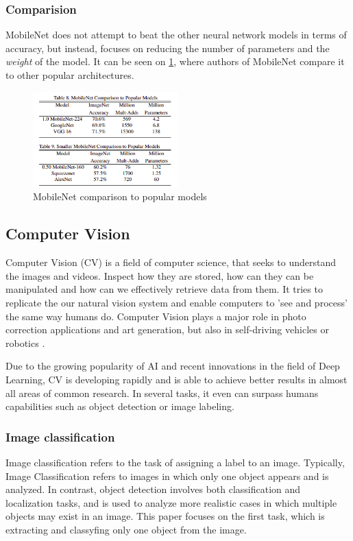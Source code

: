 \documentclass[../Main.tex]{subfiles}
\begin{document}
    \subsubsection{Comparision}
        MobileNet does not attempt to beat the other neural network models in terms of accuracy, but instead, focuses on reducing the number of parameters and the \textit{weight} of the model. It can be seen on \ref{fig:mobilenet-comp}, where authors of MobileNet compare it to other popular architectures.
            \begin{figure}[H]
                \centering
                \includegraphics[width=0.5\textwidth]{Images/02_mobilenet-comparision.png}
                \caption{MobileNet comparison to popular models \cite{MobileNet2017}}
                \label{fig:mobilenet-comp}
            \end{figure}
    
    
    

\subsection{Computer Vision}
    Computer Vision (CV) is a field of computer science, that seeks to understand the images and videos. Inspect how they are stored, how can they can be manipulated and how can we effectively retrieve data from them. It tries to replicate the our natural vision system and enable computers to 'see and process' the same way humans do. Computer Vision plays a major role in photo correction applications and art generation, but also in self-driving vehicles or robotics \cite{towardsdatascience}.
    
    Due to the growing popularity of AI and recent innovations in the field of Deep Learning, CV is developing rapidly and is able to achieve better results in almost all areas of common research. In several tasks, it even can surpass humans capabilities such as object detection or image labeling. 

    \subsubsection{Image classification}
    Image classification refers to the task of assigning a label to an image. Typically, Image Classification refers to images in which only one object appears and is analyzed. In contrast, object detection involves both classification and localization tasks, and is used to analyze more realistic cases in which multiple objects may exist in an image. This paper focuses on the first task, which is extracting and classyfing only one object from the image. \cite{googledev-images}
    
\end{document}
